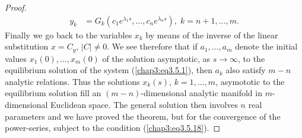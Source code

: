 \begin{proof}
\begin{align*}
y_k & = G_k (c_1 e^{\lambda_1s} , \ldots, c_n e^{\lambda_ns}), \; k =
n+ 1, \ldots, m. 
\end{align*}\pageoriginale
Finally we go back to the variables $x_k$ by means of the inverse of
the linear substitution $x = C_y$, $|C| \neq 0$. We see therefore that
if $a_1, \ldots, a_m$ denote the initial values $x_1(0), \ldots,
x_m(0)$ of the solution asymptotic, as $s\to \infty$, to the
equilibrium solution of the system (\ref{chap3:eq3.5.1}), then $a_k$
also satisfy $m-n$ analytic relations. Thus the solutions $x_k(s)$, $k
=1, \ldots, m$, asymototic to the equilibrium solution fill an
$(m-n)$-dimensional analytic manifold in $m$-dimensional Euclidean
space. The general solution then involves $n$ real parameters and we
have proved the theorem, but for the convergence of the power-series,
subject to the condition (\ref{chap3:eq3.5.18}). 


\end{proof}

